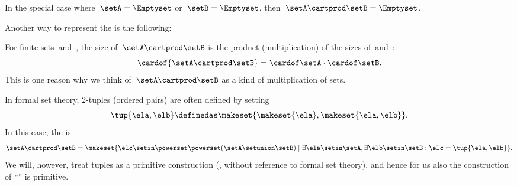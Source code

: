 In the special case where~$\setA = \Emptyset$ or~$\setB = \Emptyset$, then~$\setA \cartprod \setB = \Emptyset$.

Another way to represent the  is the following:
%

%

\begin{remark}
    For finite sets~\setA and~\setB, the size of~$\setA \cartprod \setB$ is the product (multiplication) of the sizes of~\setA and~\setB:
    \begin{equation}
        \cardof{\setA \cartprod \setB} = \cardof\setA \cdot \cardof \setB.
    \end{equation}
    This is one reason why we think of~$\setA \cartprod \setB$ as a kind of multiplication of sets.
\end{remark}

\begin{remark}
    In formal set theory, 2-tuples (ordered pairs) are often defined by setting
    \begin{equation}
        \label{eq:ordered-pair}
        \tup{\ela, \elb} \definedas \makeset{ \makeset{\ela }, \makeset{ \ela, \elb } }.
    \end{equation}
    In this case, the  is
    \begin{equation}
        \setA \cartprod \setB = \makeset{ \elc \setin\powerset \powerset (\setA \setunion \setB) \mid \exists \ela \setin\setA, \exists \elb \setin\setB : \elc = \tup{\ela, \elb} }.
    \end{equation}
    We will, however, treat tuples as a primitive construction (\ie, without reference to formal set theory), and hence for us also the construction of ``'' is primitive.
\end{remark}


